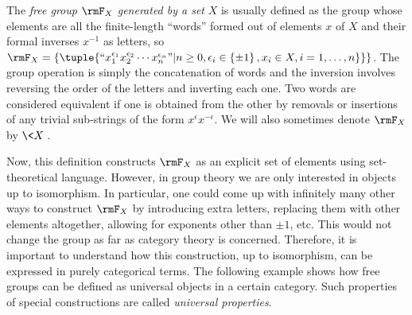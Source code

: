 \begin{defn}
    The \emph{free group} $\rmF_{X}$ \emph{generated by a set} $X$
    is usually defined as the group whose elements are all the finite-length
    ``words'' formed out of elements $x$ of $X$ and their formal inverses
    $x^{-1}$ as letters, so $\rmF_{X}=\left\{ \tuple{\text{``}x_{1}^{\epsilon_{1}}x_{2}^{\epsilon_{2}}\cdots x_{n}^{\epsilon_{n}}\text{''}|n\geq0,\epsilon_{i}\in\left\{ \pm1\right\} ,x_{i}\in X,i=1,\ldots,n\}}\right\} $.
    The group operation is simply the concatenation of words and the inversion
    involves reversing the order of the letters and inverting each one. Two words are considered equivalent if one is obtained from the other by removals or insertions of any trivial sub-strings of the form $x^{\epsilon}x^{-\epsilon}$. We will also sometimes denote $\rmF_X$ by $\<X\>$.
\end{defn}
Now, this definition constructs $\rmF_{X}$ as an explicit set of elements
using set-theoretical language. However, in group theory we are only
interested in objects up to isomorphism. In particular, one could
come up with infinitely many other ways to construct $\rmF_{X}$ by introducing
extra letters, replacing them with other elements altogether, allowing for exponents other than $\pm 1$, etc. This
would not change the group as far as category theory is concerned.
Therefore, it is important to understand how this construction, up
to isomorphism, can be expressed in purely categorical terms. The
following example shows how free groups can be defined as universal
objects in a certain category. Such properties of special constructions
are called \emph{universal properties}.
